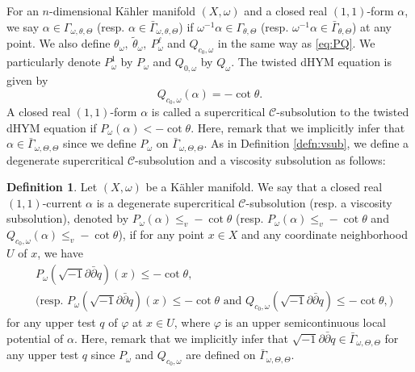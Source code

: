 \documentclass{amsart}
\numberwithin{equation}{section}
\theoremstyle{plain}
\theoremstyle{definition}
\newtheorem{defn}[equation]{Definition}
\theoremstyle{remark}
\newcommand{\delb}{\sqrt{-1}\partial\bar{\partial}}
\begin{document}
For an $n$-dimensional Kähler manifold $(X,\omega)$ and a closed real $(1,1)$-form $\alpha$, we say $\alpha\in{\Gamma}_{\omega,\theta,\Theta}$ (resp. $\alpha\in\bar{\Gamma}_{\omega,\theta,\Theta}$)  if $\omega^{-1}\alpha\in{\Gamma}_{\theta,\Theta}$ (resp. $\omega^{-1}\alpha\in\bar{\Gamma}_{\theta,\Theta}$) at any point. We also define
$\theta_\omega,\ \tilde{\theta}_\omega,\ P^\ell_\omega$ and $Q_{c_0,\omega}$ in the same way as \eqref{eq:PQ}. We particularly denote $P^1_\omega$ by $P_\omega$ and $Q_{0,\omega}$ by $Q_\omega$. The twisted dHYM equation is given by
\begin{equation}\label{eq:tdHYMop}
    Q_{c_0,\omega}(\alpha)=-\cot\theta.
\end{equation}
A closed real $(1,1)$-form $\alpha$ is called a supercritical $\mathcal{C}$-subsolution to the twisted dHYM equation if $P_\omega(\alpha)<-\cot\theta$. Here, remark that we implicitly infer that $\alpha\in\bar{\Gamma}_{\omega,\Theta,\Theta}$ since we define $P_\omega$ on $\bar{\Gamma}_{\omega,\Theta,\Theta}$.
As in Definition \ref{defn:vsub}, we define a degenerate supercritical $\mathcal{C}$-subsolution and a viscosity subsolution as follows:

\begin{defn}\label{defn:dhymvsub}
    Let $(X,\omega)$ be a K{\"a}hler manifold. 
    We say that a closed real $(1,1)$-current $\alpha$ is a degenerate supercritical $\mathcal{C}$-subsolution (resp. a viscosity subsolution), denoted by $P_\omega(\alpha)\le_v-\cot\theta$ (resp. $P_\omega(\alpha)\le_v-\cot\theta$ and $Q_{c_0,\omega}(\alpha)\le_v-\cot\theta$), if for any point $x\in X$ and any coordinate neighborhood $U$ of $x$, we have  
    \begin{align*}
        &P_\omega(\delb q)(x)\le -\cot\theta, \\
        &\bigg( \text{resp. } P_\omega(\delb q)(x)\le -\cot\theta \text{ and } Q_{c_0,\omega}(\delb q)\le-\cot\theta,\bigg)
    \end{align*}
    for any upper test $q$ of $\varphi$ at $x \in U$, where $\varphi$ is an upper semicontinuous local potential of $\alpha$. Here, remark that we implicitly infer that $\delb q\in\bar{\Gamma}_{\omega,\Theta,\Theta}$ for any upper test $q$ since $P_\omega$ and $Q_{c_0,\omega}$ are defined on $\bar{\Gamma}_{\omega,\Theta,\Theta}$. 
\end{defn}
\end{document}
